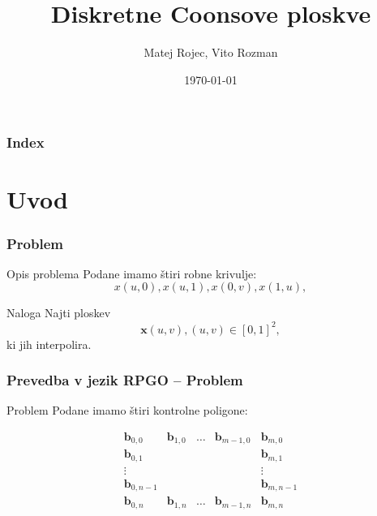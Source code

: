 \documentclass{beamer}
\begin{document}

\title{Diskretne Coonsove ploskve}
\author{Matej Rojec, Vito Rozman}
\date{\today}

\begin{frame}
   \titlepage
\end{frame}






\begin{frame}
\frametitle{Index}
   \tableofcontents
\end{frame}



\section{Uvod}



\begin{frame}
\frametitle{Problem}
\begin{block}{Opis problema}
Podane imamo štiri robne krivulje: 
$$x(u,0), x(u,1), x(0,v),  x(1,u),$$
\end{block}

\begin{block}{Naloga}
Najti ploskev
$$\mathbf{x}(u,v), (u,v) \in [0,1]^2,$$ 
ki jih interpolira.
\end{block}

\end{frame}


\begin{frame}
    \frametitle{Prevedba v jezik RPGO -- Problem}
    \begin{block}{Problem}
    Podane imamo štiri kontrolne poligone: 
    
    $$
    \begin{matrix}
       \mathbf{b}_{0,0}  &\mathbf{b}_{1,0} & \ldots &\mathbf{b}_{m-1,0} &\mathbf{b}_{m,0} \\
       \mathbf{b}_{0,1}  &                 &        &                   &\mathbf{b}_{m,1} \\
       \vdots            &                 &        &                   &  \vdots\\
       \mathbf{b}_{0,n-1} &                &        &                    &\mathbf{b}_{m,n-1} \\ 
       \mathbf{b}_{0,n}  &\mathbf{b}_{1,n} & \ldots &\mathbf{b}_{m-1,n} &\mathbf{b}_{m,n} 
    \end{matrix}
    $$
          
\end{block}
    
\end{frame}
\end{document}
